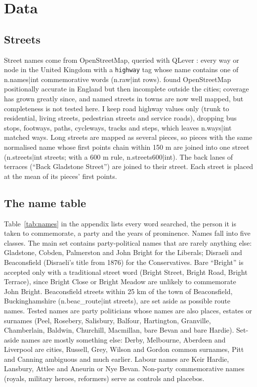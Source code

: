 \documentclass[11pt,a4paper]{article}
\begin{document}
\section{Data}
\subsection{Streets}
Street names come from OpenStreetMap, queried with QLever \citep{bast2017}: every way or node in the United Kingdom with a \texttt{highway} tag whose name contains one of {{n.names|int}} commemorative words ({{n.raw|int}} rows). \citet{haklay2010} found OpenStreetMap positionally accurate in England but then incomplete outside the cities; coverage has grown greatly since, and named streets in towns are now well mapped, but completeness is not tested here. I keep road highway values only (trunk to residential, living streets, pedestrian streets and service roads), dropping bus stops, footways, paths, cycleways, tracks and steps, which leaves {{n.ways|int}} matched ways. Long streets are mapped as several pieces, so pieces with the same normalised name whose first points chain within 150 m are joined into one street ({{n.streets|int}} streets; with a 600 m rule, {{n.streets600|int}}). The back lanes of terraces (``Back Gladstone Street'') are joined to their street. Each street is placed at the mean of its pieces' first points.

\subsection{The name table}
Table~\ref{tab:names} in the appendix lists every word searched, the person it is taken to commemorate, a party and the years of prominence. Names fall into five classes. The main set contains party-political names that are rarely anything else: Gladstone, Cobden, Palmerston and John Bright for the Liberals; Disraeli and Beaconsfield (Disraeli's title from 1876) for the Conservatives. Bare ``Bright'' is accepted only with a traditional street word (Bright Street, Bright Road, Bright Terrace), since Bright Close or Bright Meadow are unlikely to commemorate John Bright. Beaconsfield streets within 25 km of the town of Beaconsfield, Buckinghamshire ({{n.beac_route|int}} streets), are set aside as possible route names. Tested names are party politicians whose names are also places, estates or surnames (Peel, Rosebery, Salisbury, Balfour, Hartington, Granville, Chamberlain, Baldwin, Churchill, Macmillan, bare Bevan and bare Hardie). Set-aside names are mostly something else: Derby, Melbourne, Aberdeen and Liverpool are cities, Russell, Grey, Wilson and Gordon common surnames, Pitt and Canning ambiguous and much earlier. Labour names are Keir Hardie, Lansbury, Attlee and Aneurin or Nye Bevan. Non-party commemorative names (royals, military heroes, reformers) serve as controls and placebos.
\end{document}
